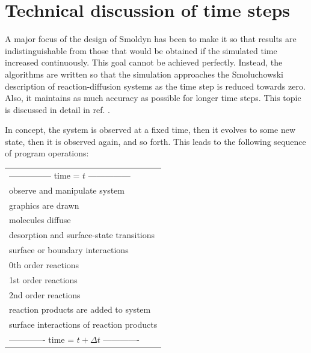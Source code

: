\documentclass {scrbook}
\begin{document}
\section{Technical discussion of time steps}

A major focus of the design of Smoldyn has been to make it so that results are indistinguishable from those that would be obtained if the simulated time increased continuously. This goal cannot be achieved perfectly. Instead, the algorithms are written so that the simulation approaches the Smoluchowski description of reaction-diffusion systems as the time step is reduced towards zero. Also, it maintains as much accuracy as possible for longer time steps. This topic is discussed in detail in ref. \cite{Andrews_Bray_2004}.

In concept, the system is observed at a fixed time, then it evolves to some new state, then it is observed again, and so forth. This leads to the following sequence of program operations:

\begin{longtable}[c]{l}
--------------- time = $t$ ---------------\\
observe and manipulate system\\
graphics are drawn\\
molecules diffuse\\
desorption and surface-state transitions\\
surface or boundary interactions\\
0th order reactions\\
1st order reactions\\
2nd order reactions\\
reaction products are added to system\\
surface interactions of reaction products\\
------------- time = $t + \Delta t$ -------------
\end{longtable}
\end{document}
